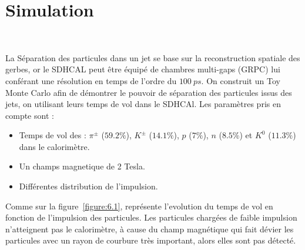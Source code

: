 \section{Simulation}
\label{p6}
~\par La S\'eparation des particules dans un jet se base sur la reconstruction spatiale des gerbes, or le SDHCAL peut \^etre \'equip\'e de chambres multi-gaps (GRPC) lui conf\'erant une r\'esolution en temps de l'ordre du $100~ps$. On construit un Toy Monte Carlo afin de d\'emontrer le pouvoir de s\'eparation des particules issus des jets, on utilisant leurs temps de vol dans le SDHCAl. Les param\`etres pris en compte sont :\\
\begin{itemize}
\item Temps de vol des : $\pi^{\pm}$ ($59.2\%$), $K^{\pm}$ ($14.1\%$), $p$ ($7\%$), $n$ ($8.5\%$) et $K^{0}$ ($11.3\%$) dans le calorim\`etre. \\
\item Un champs magnetique de 2 Tesla.\\
\item Diff\'erentes distribution de l'impulsion.\\ 
\end{itemize}
 
Comme sur la figure~\ref{figure:6.1}, repr\'esente l'evolution du temps de vol en fonction de l'impulsion des particules. Les particules charg\'ees de faible impulsion n'atteignent pas le calorim\`etre, \`a cause du champ magn\'etique qui fait d\'evier les particules avec un rayon de courbure tr\`es important, alors elles sont pas d\'etect\'e.

